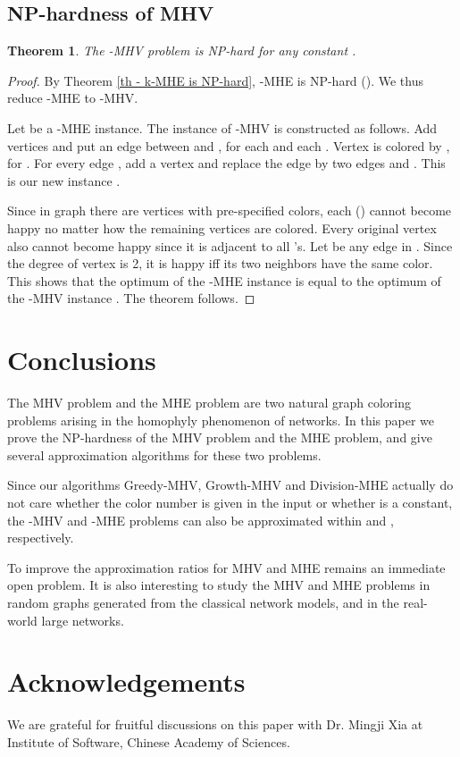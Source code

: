 \documentclass[11pt]{article}
\newtheorem{theorem}{Theorem}[section]
\newcommand{\qed}{\vrule height4pt width4pt depth2pt}
\begin{document}
\subsection{NP-hardness of MHV}
\label{subsec - NP-hardness of MHV}
\begin{theorem}
The -MHV problem is NP-hard for any constant .
\end{theorem}
\begin{proof}
By Theorem \ref{th - k-MHE is NP-hard}, -MHE is NP-hard ().
We thus reduce -MHE to -MHV.

Let  be a -MHE instance. The instance  of -MHV
is constructed as follows.
Add  vertices  and put an edge between 
and , for each  and each .
Vertex  is colored by , for .
For every edge , add a vertex  and replace the edge
by two edges  and .
This is our new instance .

Since in graph  there are vertices with pre-specified colors,
each  () cannot become happy no matter how the remaining
vertices are colored. Every original vertex  also cannot become happy
since it is adjacent to all 's.
Let  be any edge in . Since the degree of vertex  is 2,
it is happy iff its two neighbors have the same color.
This shows that the optimum of the -MHE instance  is equal to
the optimum of the -MHV instance .
The theorem follows.
\qed
\end{proof}




\section{Conclusions}
\label{sec - conclusions}
The MHV problem and the MHE problem are two natural graph coloring problems
arising in the homophyly phenomenon of networks. In this paper we prove
the NP-hardness of the MHV problem and the MHE problem, and give several
approximation algorithms for these two problems.

Since our algorithms {\sc Greedy-MHV}, {\sc Growth-MHV} and {\sc Division-MHE}
actually do not care whether the color number  is given in the input or
whether  is a constant, the -MHV and -MHE problems can also be
approximated within  and , respectively.

To improve the approximation ratios for MHV and MHE remains an immediate
open problem. It is also interesting to study the MHV and MHE problems
in random graphs generated from the classical network models, and in the
real-world large networks.


\section*{Acknowledgements}
We are grateful for fruitful discussions on this paper with
Dr. Mingji Xia at Institute of Software, Chinese Academy of Sciences.
\end{document}
